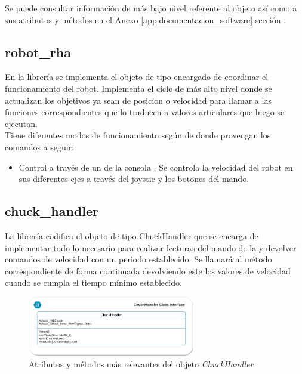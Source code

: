         Se puede consultar información de más bajo nivel referente al objeto  así como a sus atributos y métodos en el Anexo \ref{app:documentacion_software} sección \completar.
        
    \subsection{robot\_rha} \label{subsec:SW:lib:robot_rha}
        En la librería  se implementa el objeto de tipo  encargado de coordinar el funcionamiento del robot. Implementa el ciclo de más alto nivel donde se actualizan los objetivos ya sean de posicion o velocidad para llamar a las funciones correspondientes que lo traducen a valores articulares que luego se ejecutan.
        \\ 
        
        Tiene diferentes modos de funcionamiento según de donde provengan los comandos a seguir:
        \begin{itemize}
            \item Control a través de un  de la consola . Se controla la velocidad del robot en sus diferentes ejes a través del joystic y los botones del mando. 
        
        \end{itemize}
        
    \subsection{chuck\_handler} \label{subsec:SW:lib:chuck_handler}
        La librería  codifica el objeto de tipo ChuckHandler que se encarga de implementar todo lo necesario para realizar lecturas del mando  de la  y devolver comandos de velocidad con un periodo establecido. Se llamará al método correspondiente de forma continuada devolviendo este los valores de velocidad cuando se cumpla el tiempo mínimo establecido.

        \begin{figure}[H]
          	\centering
          	\includegraphics[width=0.65\textwidth]{figuras/Imagenes_SW/class_diagram_CHH.png}   
          	\caption{Atributos y métodos más relevantes del objeto \textit{ChuckHandler}}
          	\label{fig:SW:class_diagram_CHH}
        \end{figure}
        
